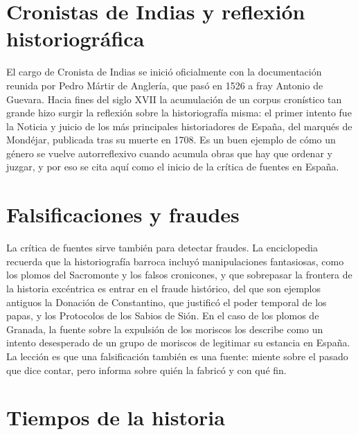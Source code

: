 \documentclass{book}
\begin{document}
\section{Cronistas de Indias y reflexión historiográfica}

El cargo de Cronista de Indias se inició oficialmente con la documentación reunida por Pedro Mártir de Anglería, que pasó en 1526 a fray Antonio de Guevara. Hacia fines del siglo XVII la acumulación de un corpus cronístico tan grande hizo surgir la reflexión sobre la historiografía misma: el primer intento fue la Noticia y juicio de los más principales historiadores de España, del marqués de Mondéjar, publicada tras su muerte en 1708. Es un buen ejemplo de cómo un género se vuelve autorreflexivo cuando acumula obras que hay que ordenar y juzgar, y por eso se cita aquí como el inicio de la crítica de fuentes en España.


\section{Falsificaciones y fraudes}

La crítica de fuentes sirve también para detectar fraudes. La enciclopedia recuerda que la historiografía barroca incluyó manipulaciones fantasiosas, como los plomos del Sacromonte y los falsos cronicones, y que sobrepasar la frontera de la historia excéntrica es entrar en el fraude histórico, del que son ejemplos antiguos la Donación de Constantino, que justificó el poder temporal de los papas, y los Protocolos de los Sabios de Sión. En el caso de los plomos de Granada, la fuente sobre la expulsión de los moriscos los describe como un intento desesperado de un grupo de moriscos de legitimar su estancia en España. La lección es que una falsificación también es una fuente: miente sobre el pasado que dice contar, pero informa sobre quién la fabricó y con qué fin.


\section{Tiempos de la historia}
\end{document}
